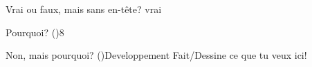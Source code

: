 \documentclass[letterpaper,12pt]{article}
\begin{document}
\begin{questions}
  \begin{vraiOuFaux}
    {Vrai ou faux, mais sans en-tête?}
    {vrai}
  \end{vraiOuFaux}
  
  
  \enteteSectionDeveloppement
   
  \begin{Developpement}{Pourquoi? ()}{8}
  \end{Developpement}

  \begin{customQuestion}{Non, mais pourquoi? ()}{Developpement}
	Fait/Dessine ce que tu veux ici!  
	
   \end{customQuestion}
   
  
\end{questions}
\end{document}
